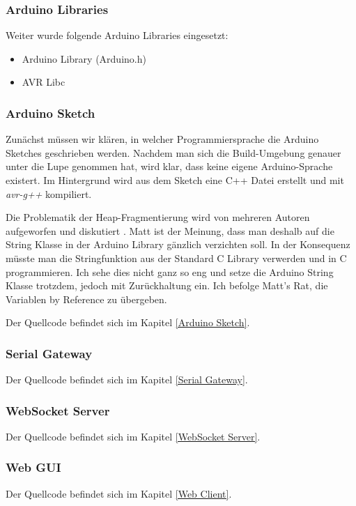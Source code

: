 \subsubsection{Arduino Libraries}
Weiter wurde folgende Arduino Libraries eingesetzt:
\begin{itemize}
  \item Arduino Library (Arduino.h) \cite{sprachreferenz}\cite{codeReferenz}\cite{arduinoCheatSheet}
  \item AVR Libc \cite{avrlibc}
\end{itemize}

\subsubsection{Arduino Sketch}
Zunächst müssen wir klären, in welcher Programmiersprache die Arduino Sketches geschrieben werden. Nachdem man sich die Build-Umgebung genauer unter die Lupe genommen hat, wird klar, dass keine eigene Arduino-Sprache existert\cite{arduinoLanguage}. Im Hintergrund wird aus dem Sketch eine C++ Datei erstellt und mit \textit{avr-g++} kompiliert.

Die Problematik der Heap-Fragmentierung wird von mehreren Autoren aufgeworfen und diskutiert \cite{heapFragmentation}\cite{heapFragmentation2}. Matt ist der Meinung, dass man deshalb auf die String Klasse in der Arduino Library gänzlich verzichten soll\cite{arduinoStrings}. In der Konsequenz müsste man die Stringfunktion aus der Standard C Library\cite{avrlibc} verwerden und in C programmieren. Ich sehe dies nicht ganz so eng und setze die Arduino String Klasse trotzdem, jedoch mit Zurückhaltung ein. Ich befolge Matt's Rat, die Variablen by Reference zu übergeben\cite{arduinoStrings}.

Der Quellcode befindet sich im Kapitel \ref{Arduino Sketch}.

\subsubsection{Serial Gateway}
Der Quellcode befindet sich im Kapitel \ref{Serial Gateway}.

\subsubsection{WebSocket Server}
Der Quellcode befindet sich im Kapitel \ref{WebSocket Server}.

\subsubsection{Web GUI}
Der Quellcode befindet sich im Kapitel \ref{Web Client}.